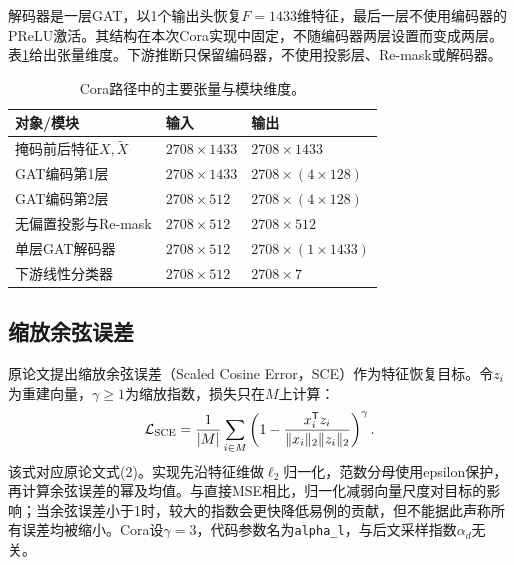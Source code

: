 解码器是一层GAT，以1个输出头恢复$F=1433$维特征，最后一层不使用编码器的PReLU激活。其结构在本次Cora实现中固定，不随编码器两层设置而变成两层。表\ref{tab:dimensions}给出张量维度。下游推断只保留编码器，不使用投影层、Re-mask或解码器。
\begin{table}[tbp]
\centering\small
\caption{Cora路径中的主要张量与模块维度。}\label{tab:dimensions}
\begin{tabular}{lll}\toprule
对象/模块 & 输入 & 输出\\\midrule
掩码前后特征$X,\widetilde X$ & $2708\times1433$ & $2708\times1433$\\
GAT编码第1层 & $2708\times1433$ & $2708\times(4\times128)$\\
GAT编码第2层 & $2708\times512$ & $2708\times(4\times128)$\\
无偏置投影与Re-mask & $2708\times512$ & $2708\times512$\\
单层GAT解码器 & $2708\times512$ & $2708\times(1\times1433)$\\
下游线性分类器 & $2708\times512$ & $2708\times7$\\\bottomrule
\end{tabular}
\end{table}

\subsection{缩放余弦误差}
原论文提出缩放余弦误差（Scaled Cosine Error，SCE）作为特征恢复目标。令$z_i$为重建向量，$\gamma\ge1$为缩放指数，损失只在$M$上计算：
\begin{equation}\label{eq:sce}
\mathcal L_{\rm SCE}=\frac1{|M|}\sum_{i\in M}
\left(1-\frac{x_i^{\mathsf T}z_i}{\|x_i\|_2\|z_i\|_2}\right)^\gamma.
\end{equation}
该式对应原论文式(2)。实现先沿特征维做$\ell_2$归一化，范数分母使用epsilon保护，再计算余弦误差的幂及均值。与直接MSE相比，归一化减弱向量尺度对目标的影响；当余弦误差小于1时，较大的指数会更快降低易例的贡献，但不能据此声称所有误差均被缩小。Cora设$\gamma=3$，代码参数名为\texttt{alpha\_l}，与后文采样指数$\alpha_d$无关。

